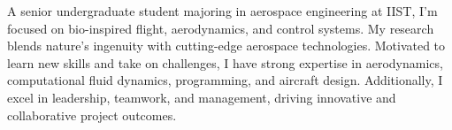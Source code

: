 

\begin{cvparagraph}
    A senior undergraduate student majoring in aerospace engineering at IIST, I'm focused on bio-inspired flight, aerodynamics, and control systems. My research blends nature's ingenuity with cutting-edge aerospace technologies. Motivated to learn new skills and take on challenges, I have strong expertise in aerodynamics, computational fluid dynamics, programming, and aircraft design. Additionally, I excel in leadership, teamwork, and management, driving innovative and collaborative project outcomes.
\end{cvparagraph}